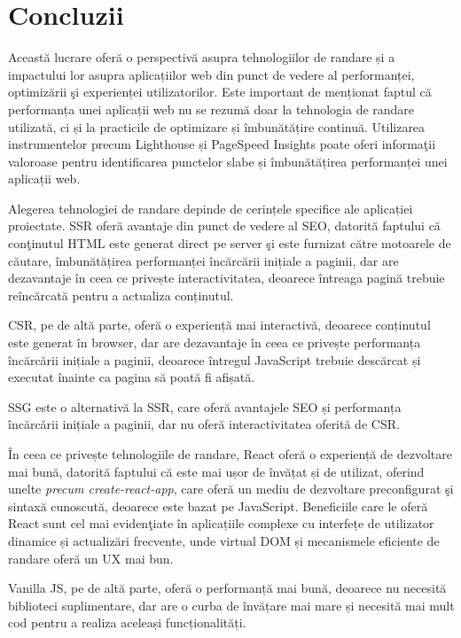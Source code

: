 \documentclass[12pt, a4paper]{report}
\begin{document}
\chapter{Concluzii}

Această lucrare ofer\u a o perspectivă asupra tehnologiilor de randare și a impactului lor asupra aplicațiilor web din punct de vedere al performanței, optimizării \c si experienței utilizatorilor.
Este important de menționat faptul că performanța unei aplicații web nu se rezumă doar la tehnologia de randare utilizată, ci și la practicile de optimizare și îmbunătățire continuă. Utilizarea instrumentelor precum Lighthouse și PageSpeed Insights poate oferi informa\c tii valoroase pentru identificarea punctelor slabe și îmbunătățirea performanței unei aplicații web.

Alegerea tehnologiei de randare depinde de cerințele specifice ale aplicației proiectate. SSR oferă avantaje din punct de vedere al SEO, datorită faptului c\u a con\c tinutul HTML este generat direct pe server \c si este furnizat c\u atre motoarele de c\u autare, îmbunătățirea performanței încărcării inițiale a paginii, dar are dezavantaje în ceea ce privește interactivitatea, deoarece întreaga pagină trebuie reîncărcată pentru a actualiza conținutul. 

CSR, pe de altă parte, oferă o experiență mai interactivă, deoarece conținutul este generat în browser, dar are dezavantaje în ceea ce privește performanța încărcării inițiale a paginii, deoarece întregul JavaScript trebuie descărcat și executat înainte ca pagina să poată fi afișată.

SSG este o alternativă la SSR, care oferă avantajele SEO și performanța încărcării inițiale a paginii, dar nu oferă interactivitatea oferită de CSR. 

În ceea ce privește tehnologiile de randare, React oferă o experiență de dezvoltare mai bună, datorită faptului că este mai ușor de învățat și de utilizat, oferind unelte \textit{precum create-react-app}, care oferă un mediu de dezvoltare preconfigurat \c si sintax\u a cunoscut\u a, deoarece este bazat pe JavaScript. Beneficiile care le ofer\u a React sunt cel mai eviden\c tiate în aplicațiile complexe cu interfețe de utilizator dinamice și actualizări frecvente, unde virtual DOM și mecanismele eficiente de randare oferă un UX mai bun.

Vanilla JS, pe de altă parte, oferă o performanță mai bună, deoarece nu necesită biblioteci suplimentare, dar are o curba de învățare mai mare și necesită mai mult cod pentru a realiza aceleași funcționalități.
\end{document}
